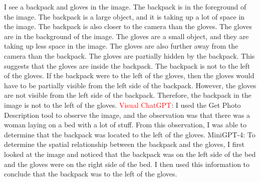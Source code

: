 \begin{enumerate}
    I see a backpack and gloves in the image.
    The backpack is in the foreground of the image. The backpack is a large object, and it is taking up a lot of space in the image. The backpack is also closer to the camera than the gloves.
    The gloves are in the background of the image. The gloves are a small object, and they are taking up less space in the image. The gloves are also further away from the camera than the backpack.
    The gloves are partially hidden by the backpack. This suggests that the gloves are inside the backpack.
    The backpack is not to the left of the gloves. If the backpack were to the left of the gloves, then the gloves would have to be partially visible from the left side of the backpack. However, the gloves are not visible from the left side of the backpack.
    Therefore, the backpack in the image is not to the left of the gloves.
    \subitem \textcolor{red}{Visual ChatGPT}: I used the Get Photo Description tool to observe the image, and the observation was that there was a woman laying on a bed with a lot of stuff. From this observation, I was able to determine that the backpack was located to the left of the gloves.
    \subitem MiniGPT-4: To determine the spatial relationship between the backpack and the gloves, I first looked at the image and noticed that the backpack was on the left side of the bed and the gloves were on the right side of the bed. I then used this information to conclude that the backpack was to the left of the gloves.
\end{enumerate}
